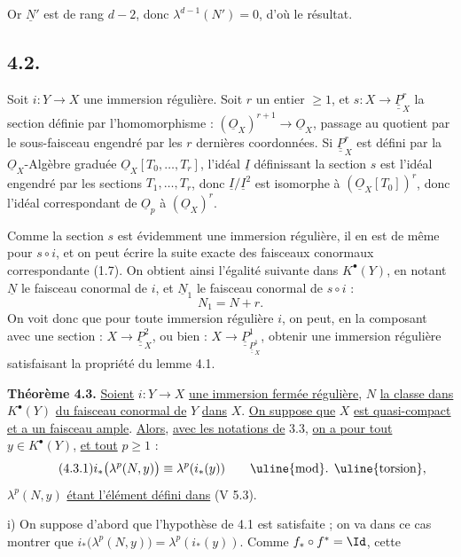 
Or \(\underline{N}'\) est de
rang \(d-2\), donc \(\lambda^{d-1}(N')=0\), d'où le résultat.

\subsection*{4.2.}

Soit \(i:Y\to X\) une immersion régulière. Soit \(r\) un entier \(\ge1\), et \(s:X\longrightarrow \underline{\underline{P}}_X^r\) la section définie par l'homomorphisme : \((\underline{O}_X)^{r+1}\to\underline{O}_X\), passage au quotient par le sous-faisceau engendré par les \(r\) dernières coordonnées. Si \(\underline{\underline{P}}_X^r\) est défini par la \(\underline{O}_X\)-Algèbre graduée \(\underline{O}_X[T_0,\ldots,T_r]\), l'idéal \(\underline{I}\) définissant la section \(s\) est l'idéal engendré par les sections \(T_1,\ldots,T_r\), donc \(\underline{I}/\underline{I}^2\) est isomorphe à \((\underline{O}_X[T_0])^r\), donc l'idéal correspondant de \(\underline{O}_p\) à \((\underline{O}_X)^r\).

Comme la section \(s\) est évidemment une immersion régulière, il en est de même pour \(s\circ i\), et on peut écrire la suite exacte des faisceaux conormaux correspondante (1.7). On obtient ainsi l'égalité suivante dans \(K^{\bullet}(Y)\), en notant \(\underline{N}\) le faisceau conormal de \(i\), et \(\underline{N}_1\) le faisceau conormal de \(s\circ i\) :
\[
  N_1=N+r.
\]
On voit donc que pour toute immersion régulière \(i\), on peut, en la composant avec une section : \(X\to\underline{\underline{P}}_X^2\), ou bien : \(X\to\underline{\underline{P}}_{\underline{\underline{P}}_X^1}^{1}\), obtenir une immersion régulière satisfaisant la propriété du lemme 4.1.

\textbf{Théorème 4.3.} \uline{Soient} \(i:Y\to X\) \uline{une immersion fermée régulière}, \(N\) \uline{la classe dans} \(K^{\bullet}(Y)\) \uline{du faisceau conormal de} \(Y\) \uline{dans} \(X\). \uline{On suppose que} \(X\) \uline{est quasi-compact et a un faisceau ample}. \uline{Alors}, \uline{avec les notations de} 3.3, \uline{on a pour tout} \(y\in K^{\bullet}(Y)\), \uline{et tout} \(p\ge1\) :
\begin{equation}\tag{4.3.1}
 i_*\bigl(\lambda^p(N,y)\bigr)\equiv \lambda^p(i_*(y))
 \qquad\text{\uline{mod}. \uline{torsion}},
\end{equation}
\(\lambda^p(N,y)\) \uline{étant l'élément défini dans} (V 5.3).

i) On suppose d'abord que l'hypothèse de 4.1 est satisfaite ; on va dans ce cas montrer que \(i_*\bigl(\lambda^p(N,y)\bigr)=\lambda^p(i_*(y))\). Comme \(f_*\circ f^*=\Id\), cette
